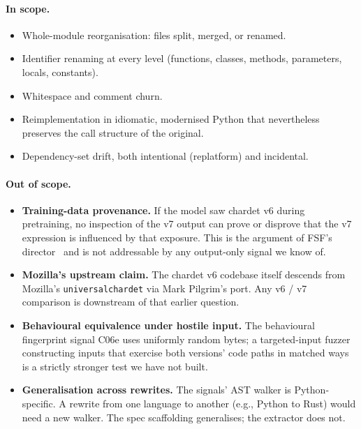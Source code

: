 \documentclass[11pt,letterpaper]{article}
\begin{document}
\paragraph{In scope.}
\begin{itemize}[leftmargin=*,nosep]
  \item Whole-module reorganisation: files split, merged, or renamed.
  \item Identifier renaming at every level (functions, classes,
    methods, parameters, locals, constants).
  \item Whitespace and comment churn.
  \item Reimplementation in idiomatic, modernised Python that
    nevertheless preserves the call structure of the original.
  \item Dependency-set drift, both intentional (replatform) and
    incidental.
\end{itemize}

\paragraph{Out of scope.}
\begin{itemize}[leftmargin=*,nosep]
  \item \textbf{Training-data provenance.} If the model saw chardet
    v6 during pretraining, no inspection of the v7 output can prove
    or disprove that the v7 expression is influenced by that
    exposure. This is the argument of FSF's
    director~\cite{theregister2026chardet} and is not addressable by
    any output-only signal we know of.
  \item \textbf{Mozilla's upstream claim.} The chardet v6 codebase
    itself descends from Mozilla's \texttt{universalchardet} via
    Mark Pilgrim's port. Any v6 / v7 comparison is downstream of
    that earlier question.
  \item \textbf{Behavioural equivalence under hostile input.} The
    behavioural fingerprint signal C06e uses uniformly random bytes;
    a targeted-input fuzzer constructing inputs that exercise both
    versions' code paths in matched ways is a strictly stronger
    test we have not built.
  \item \textbf{Generalisation across rewrites.} The signals'
    AST walker is Python-specific. A rewrite from one language to
    another (e.g., Python to Rust) would need a new walker. The
    spec scaffolding generalises; the extractor does not.
\end{itemize}
\end{document}
